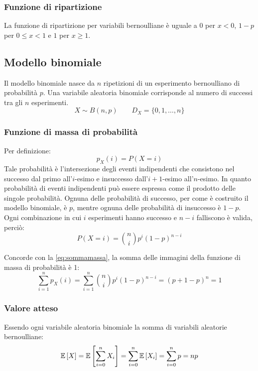 \subsubsection{Funzione di ripartizione}
La funzione di ripartizione per variabili bernoulliane è uguale a $0$ per $x<0$, $1-p$ per $0\leq x<1$ e $1$ per $x\geq 1$.



\subsection{Modello binomiale}
Il modello binomiale nasce da $n$ ripetizioni di un esperimento bernoulliano di probabilità $p$. Una variabile aleatoria binomiale corrisponde al numero di successi tra gli $n$ esperimenti.
\begin{equation*}
	X \sim B(n, p)\qquad D_X=\{0,1,\dots,n\}
\end{equation*}


\subsubsection{Funzione di massa di probabilità}
Per definizione:
\begin{equation*}
	p_X(i) = P(X=i)
\end{equation*}
Tale probabilità è l'intersezione degli eventi indipendenti che consistono nel successo dal primo all'$i$-esimo e insuccesso dall'$i+1$-esimo all'$n$-esimo. In quanto probabilità di eventi indipendenti può essere espressa come il prodotto delle singole probabilità. Ognuna delle probabilità di successo, per come è costruito il modello binomiale, è $p$, mentre ognuna delle probabilità di insuccesso è $1-p$. Ogni combinazione in cui $i$ esperimenti hanno successo e $n-i$ falliscono è valida, perciò:
\begin{equation}
	P(X=i) = \binom{n}{i} p^i(1-p)^{n-i}
\end{equation}

Concorde con la \eqref{eq:sommamassa}, la somma delle immagini della funzione di massa di probabilità è 1:
\begin{equation*}
	\sum_{i=1}^n p_X(i) = \sum_{i=1}^n \binom{n}{i} p^i(1-p)^{n-i} = (p+1-p)^n = 1
\end{equation*}


\subsubsection{Valore atteso}
Essendo ogni variabile aleatoria binomiale la somma di variabili aleatorie bernoulliane:
\begin{equation}
	\mathbb{E}\left[ X \right] = \mathbb{E}\left[ \sum_{i=0}^n X_i \right] = \sum_{i=0}^n \mathbb{E}\left[ X_i \right] = \sum_{i=0}^n p = np
\end{equation}


